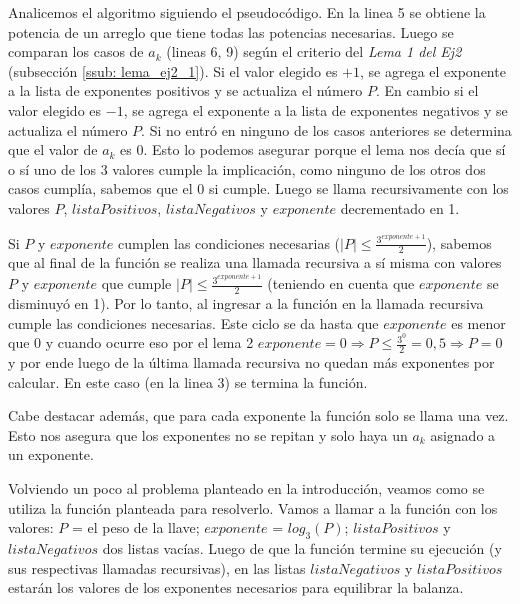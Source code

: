 \medskip

\par Analicemos el algoritmo siguiendo el pseudocódigo. En la linea 5 se obtiene la potencia de un arreglo que tiene todas las potencias necesarias. Luego se comparan los casos de $a_k$ (lineas 6, 9) según el criterio del \textit{Lema 1 del Ej2} (subsección \ref{ssub: lema_ej2_1}). Si el valor elegido es $+1$, se agrega el exponente a la lista de exponentes positivos y se actualiza el número $P$. En cambio si el valor elegido es $-1$, se agrega el exponente a la lista de exponentes negativos y se actualiza el número $P$. Si no entró en ninguno de los casos anteriores se determina que el valor de $a_{k}$ es 0. Esto lo podemos asegurar porque el lema nos decía que sí o sí uno de los 3 valores cumple la implicación, como ninguno de los otros dos casos cumplía, sabemos que el 0 si cumple. Luego se llama recursivamente con los valores $P$, $listaPositivos$, $listaNegativos$ y $exponente$ decrementado en 1.
\par Si $P$ y $exponente$ cumplen las condiciones necesarias ($| P | \leq \frac{3^{exponente+1}}{2}$), sabemos que al final de la función se realiza una llamada recursiva a sí misma con valores $P$ y $exponente$ que cumple $| P | \leq \frac{3^{exponente+1}}{2}$ (teniendo en cuenta que $exponente$ se disminuyó en 1). Por lo tanto, al ingresar a la función en la llamada recursiva cumple las condiciones necesarias. Este ciclo se da hasta que $exponente$ es menor que 0 y cuando ocurre eso por el lema 2 $exponente = 0 \Longrightarrow P \leq \frac{3^0}{2} = 0,5 \Longrightarrow P = 0$ y por ende luego de la \'ultima llamada recursiva no quedan m\'as exponentes por calcular. En este caso (en la linea 3) se termina la función.
\par Cabe destacar además, que para cada exponente la función solo se llama una vez. Esto nos asegura que los exponentes no se repitan y solo haya un $a_{k}$ asignado a un exponente.

\medskip

\par Volviendo un poco al problema planteado en la introducción, veamos como se utiliza la función planteada para resolverlo. Vamos a llamar a la función con los valores: $P$ = el peso de la llave; $exponente$ = $log_{3}(P)$; $listaPositivos$ y $listaNegativos$ dos listas vacías. Luego de que la función termine su ejecución (y sus respectivas llamadas recursivas), en las listas $listaNegativos$ y $listaPositivos$ estarán los valores de los exponentes necesarios para equilibrar la balanza.


